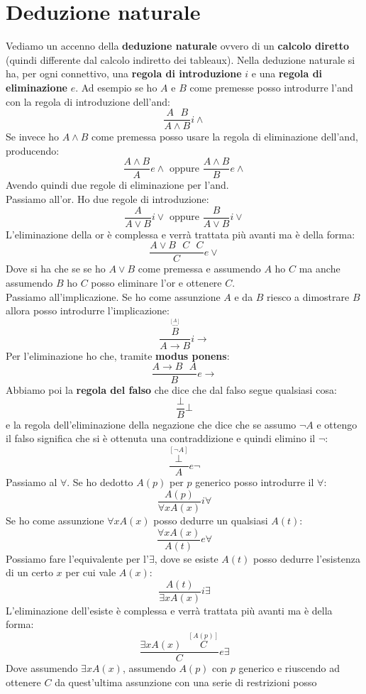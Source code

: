 \documentclass[a4paper,12pt, oneside]{book}
\begin{document}
\section{Deduzione naturale}
Vediamo un accenno della \textbf{deduzione naturale} ovvero di un
\textbf{calcolo diretto} (quindi differente dal calcolo indiretto dei
tableaux). Nella deduzione naturale si ha, per ogni connettivo, una
\textbf{regola di introduzione} $i$ e una \textbf{regola di eliminazione}
$e$. Ad esempio se ho $A$ e $B$ come premesse posso introdurre l'and con la
regola di introduzione dell'and: 
\[\frac{A\,\,\,\,B}{A\land B}i\land\]
Se invece ho $A\land B$ come premessa posso usare la regola di eliminazione
dell'and, producendo:
\[\frac{A\land B}{A}e\land\mbox{ oppure }\frac{A\land B}{B}e\land\]
Avendo quindi due regole di eliminazione per l'and.\\
Passiamo all'or. Ho due regole di introduzione:
\[\frac{A}{A\lor B}i\lor\mbox{ oppure }\frac{B}{A\lor B}i\lor\]
L'eliminazione della or è complessa e verrà trattata più avanti ma è della
forma:
\[\frac{A\lor B\,\,\,\,C\,\,\,\,C}{C}e\lor\]
Dove si ha che se se ho $A\lor B$ come premessa e assumendo $A$ ho $C$ ma anche
assumendo $B$ ho $C$ posso eliminare l'or e ottenere $C$.\\
Passiamo all'implicazione. Se ho come assunzione $A$ e da $B$ riesco a
dimostrare $B$ allora posso introdurre l'implicazione:
\[\frac{\stackrel{\stackrel{[A]}{\cdots}}{B}}{A\to B}i\to\]
Per l'eliminazione ho che, tramite \textbf{modus ponens}:
\[\frac{A\to B\,\,\,\,A}{B}e\to\]
Abbiamo poi la \textbf{regola del falso} che dice che dal falso segue qualsiasi
cosa: 
\[\frac{\bot}{B}\bot\]
e la regola dell'eliminazione della negazione che dice che se assumo $\neg A$ e
ottengo il falso significa che si è ottenuta una contraddizione e quindi elimino
il $\neg$:
\[\frac{\stackrel{[\neg A]}{\bot}}{A}e\neg\]
Passiamo al $\forall$. Se ho dedotto $A(p)$ per $p$ generico posso introdurre il
$\forall$:
\[\frac{A(p)}{\forall xA(x)}i\forall\]
Se ho come assunzione $\forall xA(x)$ posso dedurre un qualsiasi $A(t)$:
\[\frac{\forall xA(x)}{A(t)}e\forall\]
Possiamo fare l'equivalente per l'$\exists$, dove se esiste $A(t)$ posso dedurre
l'esistenza di un certo $x$ per cui vale $A(x)$:
\[\frac{A(t)}{\exists xA(x)}i\exists\]
L'eliminazione dell'esiste è complessa e verrà trattata più avanti ma è della
forma:
\[\frac{\exists xA(x)\,\,\,\,\stackrel{[A(p)]}{C}}{C}e\exists\]
Dove assumendo $\exists xA(x)$, assumendo $A(p)$ con $p$ generico e riuscendo ad
ottenere $C$ da quest'ultima assunzione con una serie di restrizioni posso
\end{document}
